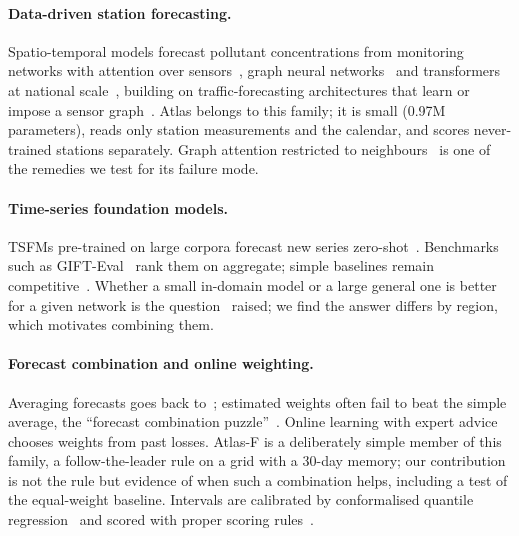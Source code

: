 \documentclass{article}
\begin{document}
\paragraph{Data-driven station forecasting.} Spatio-temporal models forecast pollutant concentrations from monitoring
networks with attention over sensors~\citep{liang2018geoman}, graph neural networks~\citep{wang2020pm25gnn} and
transformers at national scale~\citep{liang2023airformer}, building on traffic-forecasting architectures that learn or
impose a sensor graph~\citep{li2018dcrnn,wu2019graphwavenet,bai2020agcrn}. Atlas belongs to this family; it is small
(0.97M parameters), reads only station measurements and the calendar, and scores never-trained stations separately.
Graph attention restricted to neighbours~\citep{velickovic2018gat} is one of the remedies we test for its failure mode.

\paragraph{Time-series foundation models.} TSFMs pre-trained on large corpora forecast new series
zero-shot~\citep{das2024timesfm,ansari2024chronos,woo2024moirai,rasul2023lagllama,ekambaram2024ttm,liu2025sundial,auer2025tirex}.
Benchmarks such as GIFT-Eval~\citep{aksu2024gifteval} rank them on aggregate; simple baselines remain
competitive~\citep{zeng2023dlinear}. Whether a small in-domain model or a large general one is better for a given
network is the question~\citep{atlas1} raised; we find the answer differs by region, which motivates combining them.

\paragraph{Forecast combination and online weighting.} Averaging forecasts goes back to~\citet{bates1969combination};
estimated weights often fail to beat the simple average, the ``forecast combination
puzzle''~\citep{timmermann2006combinations,smith2009puzzle,claeskens2016puzzle}. Online learning with expert
advice~\citep{cesabianchi2006prediction} chooses weights from past losses. Atlas-F is a deliberately simple member of
this family, a follow-the-leader rule on a grid with a 30-day memory; our contribution is not the rule but evidence of
when such a combination helps, including a test of the equal-weight baseline. Intervals are calibrated by conformalised
quantile regression~\citep{romano2019cqr} and scored with proper scoring rules~\citep{gneiting2007scoring}.
\end{document}
